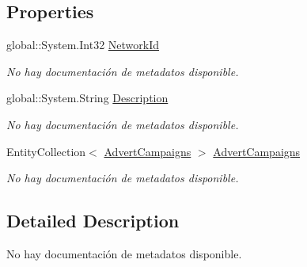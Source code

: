 \subsection*{Properties}
\begin{DoxyCompactItemize}
\item 
global\-::\-System.\-Int32 \hyperlink{class_microsoft_1_1_samples_1_1_kinect_1_1_basic_interactions_1_1_networks_acc5bd3a4f8aceda36f2d3945a6713ae9}{Network\-Id}
\begin{DoxyCompactList}\small\item\em No hay documentación de metadatos disponible. \end{DoxyCompactList}\item 
global\-::\-System.\-String \hyperlink{class_microsoft_1_1_samples_1_1_kinect_1_1_basic_interactions_1_1_networks_a1969361a20ab663c914db19261779f59}{Description}
\begin{DoxyCompactList}\small\item\em No hay documentación de metadatos disponible. \end{DoxyCompactList}\item 
Entity\-Collection$<$ \hyperlink{class_microsoft_1_1_samples_1_1_kinect_1_1_basic_interactions_1_1_advert_campaigns}{Advert\-Campaigns} $>$ \hyperlink{class_microsoft_1_1_samples_1_1_kinect_1_1_basic_interactions_1_1_networks_ae9efa43454f10240278b370421a9de30}{Advert\-Campaigns}
\begin{DoxyCompactList}\small\item\em No hay documentación de metadatos disponible. \end{DoxyCompactList}\end{DoxyCompactItemize}


\subsection{Detailed Description}
No hay documentación de metadatos disponible. 



